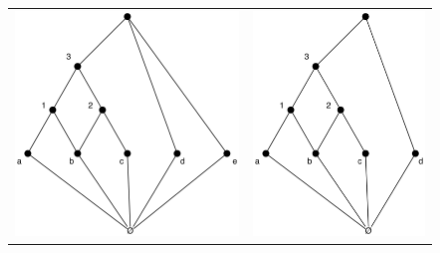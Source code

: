 \documentclass[a4paper]{report}
\begin{document}
\begin{figure}
\begin{center}
\begin{tabular}{cc}
\includegraphics[scale=.5]{images/treillis1}&\includegraphics[scale=.5]{images/treillis2}\\

\end{tabular}
\end{center}
\end{figure}
\end{document}
